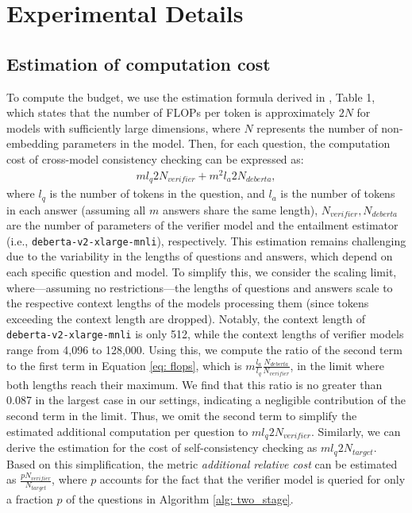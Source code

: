 
\section{Experimental Details}


\subsection{Estimation of computation cost}\label{apdx: estimation}

To compute the budget, we use the estimation formula derived in \cite{kaplan2020scaling}, Table 1, which states that the number of FLOPs per token is approximately $2N$ for models with sufficiently large dimensions, where $N$ represents the number of non-embedding parameters in the model. Then, for each question, the computation cost of cross-model consistency checking can be expressed as:
\begin{align}
    \label{eq: flops}
    ml_{q}2N_{verifier}  + m^2 l_{a}2N_{deberta},
\end{align}
where $l_{q}$ is the number of tokens in the question, and  $l_{a}$ is the number of tokens in each answer (assuming all $m$ answers share the same length), $N_{verifier},N_{deberta}$ are the number of parameters of the verifier model and the entailment estimator (i.e., \texttt{deberta-v2-xlarge-mnli}), respectively. This estimation remains challenging due to the variability in the lengths of questions and answers, which depend on each specific question and model. To simplify this, we consider the scaling limit, where—assuming no restrictions—the lengths of questions and answers scale to the respective context lengths of the models processing them (since tokens exceeding the context length are dropped). Notably, the context length of \texttt{deberta-v2-xlarge-mnli} is only 512, while the context lengths of verifier models range from 4,096 to 128,000. Using this, we compute the ratio of the second term to the first term in Equation \ref{eq: flops}, which is $ m\frac{l_{a}}{l_{q}}\frac{N_{deberta}}{N_{verifier}}$, in the limit where both lengths reach their maximum. We find that this ratio is no greater than 0.087 in the largest case in our settings, indicating a negligible contribution of the second term in the limit. Thus, we omit the second term to simplify the estimated additional computation per question to $ml_{q}2N_{verifier}$. Similarly, we can derive the estimation for the cost of self-consistency checking as $ml_{q}2N_{target}$. Based on this simplification, the metric \emph{additional relative cost} can be estimated as $ \frac{pN_{verifier}}{N_{target}}$, where  $p$ accounts for the fact that the verifier model is queried for only a fraction $p$ of the questions in Algorithm \ref{alg: two_stage}. 

